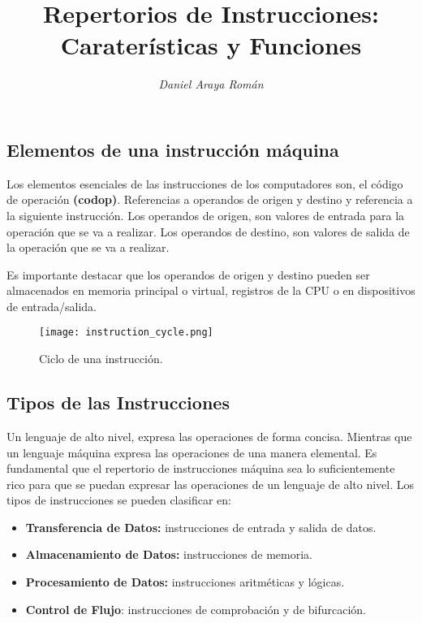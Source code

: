 \documentclass{article}
\title{\LARGE\textbf{Repertorios de Instrucciones: \\ 
                     Carater\'{i}sticas y Funciones}}
\author{\large\textit{Daniel Araya Román}}
\date{}
\begin{document}
\maketitle

\subsection*{Elementos de una instrucci\'{o}n m\'{a}quina}
Los elementos esenciales de las instrucciones de los computadores son,
el c\'{o}digo de operaci\'{o}n \textbf{(codop)}. Referencias a operandos
de origen y destino y referencia a la siguiente instrucci\'{o}n.
Los operandos de origen, son valores de entrada para la operaci\'{o}n
que se va a realizar. Los operandos de destino, son valores de salida
de la operaci\'{o}n que se va a realizar.

Es importante destacar que los operandos de origen y destino pueden ser
almacenados en memoria principal o virtual, registros de la CPU o en
dispositivos de entrada/salida.

\begin{figure}[h]
    \centering
    \texttt{[image: instruction\_cycle.png]}
    \caption{Ciclo de una instrucci\'{o}n.
    \cite {stallings2006organización}}
\end{figure}

\subsection*{Tipos de las Instrucciones}
Un lenguaje de alto nivel, expresa las operaciones de forma concisa.
Mientras que un lenguaje m\'{a}quina expresa las operaciones de una manera
elemental. Es fundamental que el repertorio de instrucciones m\'{a}quina
sea lo suficientemente rico para que se puedan expresar las operaciones
de un lenguaje de alto nivel. Los tipos de instrucciones se pueden clasificar en:

\begin{itemize}
    \item \textbf{Transferencia de Datos:}
          instrucciones de entrada y salida de datos.
    \item \textbf{Almacenamiento de Datos:}
          instrucciones de memoria.
    \item \textbf{Procesamiento de Datos:}
          instrucciones aritm\'{e}ticas y l\'{o}gicas.
    \item \textbf{Control de Flujo}:
          instrucciones de comprobaci\'{o}n y de bifurcaci\'{o}n.
\end{itemize}
\end{document}
